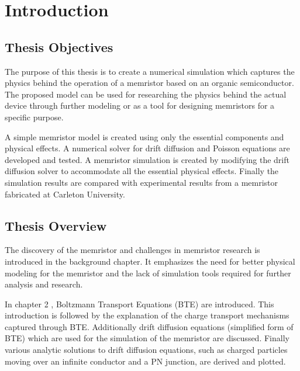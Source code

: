 
\chapter{Introduction} %


\label{Chapter1} %


\section{Thesis Objectives}
\begin{doublespace}
The purpose of this thesis is to create a numerical simulation which captures the physics behind the operation of a memristor based on an organic semiconductor. The proposed model can be used for researching the physics behind the actual device through further modeling or as a tool for designing memristors for a specific purpose. 

A simple memristor model is created using only the essential components and physical effects. A numerical solver for drift diffusion and Poisson equations are developed and tested. A memristor simulation is created by modifying the drift diffusion solver to accommodate all the essential physical effects. Finally the simulation results are compared with experimental results from a memristor fabricated at Carleton University.

\section{Thesis Overview}

The discovery of the memristor and challenges in memristor research is introduced in the background chapter. It emphasizes the need for better physical modeling for the memristor and the lack of simulation tools required for further analysis and research.

In chapter 2 , Boltzmann Transport Equations (BTE) are introduced. This introduction is followed by the explanation of the charge transport mechanisms captured through BTE. Additionally drift diffusion equations (simplified form of BTE) which are used for the simulation of the memristor are discussed. Finally various analytic solutions to drift diffusion equations, such as charged particles moving over an infinite conductor and a PN junction, are derived and plotted. 


\end{doublespace}
